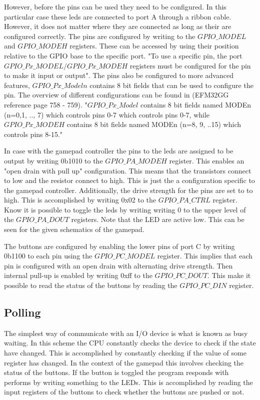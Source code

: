 However, before the pins can be used they need to be configured. In this particular case these leds are connected to port A through a ribbon cable. However, it does not matter where they are connected as long as their are configured correctly. The pins are configured by writing to the $GPIO\_MODEL$ and $GPIO\_MODEH$ registers. These can be accessed by using their position relative to the GPIO base to the specific port. "To use a specific pin, the port $GPIO\_Px\_MODEL/GPIO\_Px\_MODEH$ registers must be configured for the pin to make it input or output". The pins also be configured to more advanced features, $GPIO\_Px\_Modeln$ contains 8 bit fields that can be used to configure the pin. The overview of different configurations can be found in (EFM32GG reference page 758 - 759). "$GPIO\_Px\_Model$ contains 8 bit fields named MODEn (n=0,1, .., 7) which controls pins 0-7 which controls pins 0-7, while $GPIO\_Px\_MODEH$ contains 8 bit fields named MODEn (n=8, 9, ..15) which controls pins 8-15."  

In case with the gamepad controller the pins to the leds are assigned to be output by writing 0b1010 to the $GPIO\_PA\_MODEH$ register. This enables an "open drain with pull up" configuration. This means that the transistors connect to low and the resistor connect to high. This is just the a configuration specific to the gamepad controller. Additionally, the drive strength for the pins are set to to high. This is accomplished by writing 0x02 to the $GPIO\_PA\_CTRL$ register. Know it is possible to toggle the leds by writing writing 0 to the upper level of the $GPIO\_PA\_DOUT$ registers. Note that the LED are active low. This can be seen for the given schematics of the gamepad.   

The buttons are configured by enabling the lower pins of port C by writing 0b1100 to each pin using the $GPIO\_PC\_MODEL$ register. This implies that each pin is configured with an open drain with alternating drive strength. Then internal pull-up is enabled by writing 0xff to the $GPIO\_PC\_DOUT$. This make it possible to read the status of the buttons by reading the $GPIO\_PC\_DIN$ register. 



\subsection{Polling}\label{ch:polling}
The simplest way of communicate with an I/O device is what is known as busy waiting\cite{micro}. In this scheme the CPU constantly checks the device to check if the state have changed. This is accomplished by constantly checking if the value of some register has changed. In the context of the gamepad this involves checking the status of the buttons. If the button is toggled the program responds with performs by writing something to the LEDs. This is accomplished by reading the input registers of the buttons to check whether the buttons are pushed or not. 

